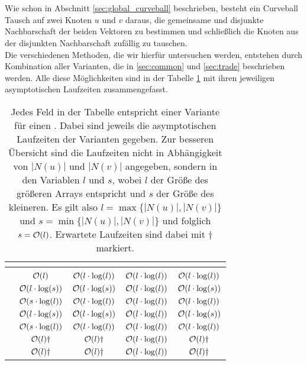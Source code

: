 

\section{\ct}
Wie schon in Abschnitt \ref{sec:global_curveball} beschrieben, 
besteht ein Curveball Tausch auf zwei Knoten $u$ und $v$ daraus, die 
gemeinsame und disjunkte Nachbarschaft der beiden Vektoren zu bestimmen
und schließlich die Knoten aus der disjunkten Nachbarschaft zufällig zu tauschen.
\\
Die verschiedenen Methoden, die wir hierfür untersuchen werden, 
entstehen durch Kombination aller Varianten, die in \ref{sec:common} und \ref{sec:trade} beschrieben 
werden. Alle diese Möglichkeiten sind in der Tabelle \ref{tab:varianten} mit ihren jeweiligen asymptotischen
Laufzeiten zusammengefasst.


\begin{table}
	\centering
	\begin{tabular}{c||c|c||c|c}
		 & \multicolumn{2}{c||}{\distr} & \multicolumn{2}{c}{\perm} \\ \hline \hline
		\fett{vorsortiert} & \true & \false & \true & \false
		\\ \hline\hline
		\SorSor 	& $\mathcal{O}(l)$ 				& $\mathcal{O}(l\cdot \log(l))$ 		& $\mathcal{O}(l \cdot \log(l))$ 					& $\mathcal{O}(l\cdot \log(l))$ 	\\ \hline
		\SeaSor 	& $\mathcal{O}(l\cdot \log(s))$ 	& $\mathcal{O}(l\cdot  \log(s))$ 	& $\mathcal{O}(l\cdot  \log(l))$ 	& $\mathcal{O}(l\cdot  \log(s))$ \\ \hline
		\SorSea 	& $\mathcal{O}(s\cdot \log(l))$ 	& $\mathcal{O}(l\cdot  \log(l))$ 	& $\mathcal{O}(l\cdot  \log(l))$ 	& $\mathcal{O}(l\cdot  \log(l))$ \\ \hline
		\SeaSet 	& $\mathcal{O}(l\cdot \log(s))$ 	& $\mathcal{O}(l\cdot  \log(s))$ 	& $\mathcal{O}(l\cdot  \log(l))$ 	& $\mathcal{O}(l\cdot  \log(s))$ \\ \hline
		\SetSea 	& $\mathcal{O}(s\cdot \log(l))$ 	& $\mathcal{O}(l\cdot  \log(l))$ 	& $\mathcal{O}(l\cdot  \log(l))$ 	& $\mathcal{O}(l\cdot  \log(l))$ \\ \hline
		\SeaUSet	& $\mathcal{O}(l) \dagger$		& $\mathcal{O}(l) \dagger$ 			& $\mathcal{O}(l\cdot  \log(l))$ 	& $\mathcal{O}(l) \dagger$		\\ \hline
		\USetSea	& $\mathcal{O}(l) \dagger$ 		& $\mathcal{O}(l) \dagger$ 			& $\mathcal{O}(l\cdot  \log(l))$ 	& $\mathcal{O}(l) \dagger$
	\end{tabular}
	\caption{Jedes Feld in der Tabelle entspricht einer Variante für einen \ct{}.
	Dabei sind jeweils die asymptotischen Laufzeiten der Varianten gegeben. Zur besseren 
	Übersicht sind die Laufzeiten nicht in Abhängigkeit von $|N(u)|$ und $|N(v)|$ angegeben, 
	sondern in den Variablen $l$ und $s$, wobei $l$ der Größe des größeren Arrays entspricht und
	$s$ der Größe des kleineren. Es gilt also $l = \max\{|N(u)|,|N(v)|\}$ und $s = \min\{|N(u)|,|N(v)|\}$ und folglich $s = \mathcal{O}(l)$.
	Erwartete Laufzeiten sind dabei mit $\dagger$ markiert.}
	\label{tab:varianten}
\end{table}



